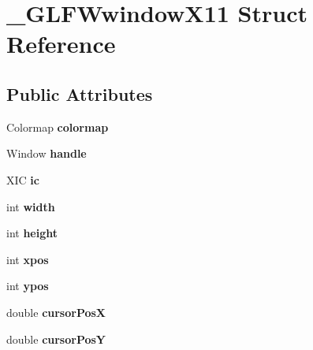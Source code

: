 \hypertarget{struct__GLFWwindowX11}{}\section{\+\_\+\+G\+L\+F\+Wwindow\+X11 Struct Reference}
\label{struct__GLFWwindowX11}
\subsection*{Public Attributes}
\begin{DoxyCompactItemize}
\item 
\hypertarget{struct__GLFWwindowX11_a7eb096618d7bbebb829afd10dded9d39}{}Colormap {\bfseries colormap}\label{struct__GLFWwindowX11_a7eb096618d7bbebb829afd10dded9d39}

\item 
\hypertarget{struct__GLFWwindowX11_a2a7044fb8deb636e3d846a381a4bc5af}{}Window {\bfseries handle}\label{struct__GLFWwindowX11_a2a7044fb8deb636e3d846a381a4bc5af}

\item 
\hypertarget{struct__GLFWwindowX11_a0f06b5e4d8d91b2934edfd65f7f9127a}{}X\+I\+C {\bfseries ic}\label{struct__GLFWwindowX11_a0f06b5e4d8d91b2934edfd65f7f9127a}

\item 
\hypertarget{struct__GLFWwindowX11_a40382828ab57154b1841abe23a33917f}{}int {\bfseries width}\label{struct__GLFWwindowX11_a40382828ab57154b1841abe23a33917f}

\item 
\hypertarget{struct__GLFWwindowX11_aa81c2c62408afb19f11f910f6132caba}{}int {\bfseries height}\label{struct__GLFWwindowX11_aa81c2c62408afb19f11f910f6132caba}

\item 
\hypertarget{struct__GLFWwindowX11_ac4b3b33298c1ac52ad1490507d45bdfc}{}int {\bfseries xpos}\label{struct__GLFWwindowX11_ac4b3b33298c1ac52ad1490507d45bdfc}

\item 
\hypertarget{struct__GLFWwindowX11_a4751f63c4f65dd88fc53ee5e10558c74}{}int {\bfseries ypos}\label{struct__GLFWwindowX11_a4751f63c4f65dd88fc53ee5e10558c74}

\item 
\hypertarget{struct__GLFWwindowX11_a4eb2843a135d3fea250fe5152107ecf0}{}double {\bfseries cursor\+Pos\+X}\label{struct__GLFWwindowX11_a4eb2843a135d3fea250fe5152107ecf0}

\item 
\hypertarget{struct__GLFWwindowX11_a1084dccf4ea26b24d41d8fbdaeca3914}{}double {\bfseries cursor\+Pos\+Y}\label{struct__GLFWwindowX11_a1084dccf4ea26b24d41d8fbdaeca3914}


\end{DoxyCompactItemize}
